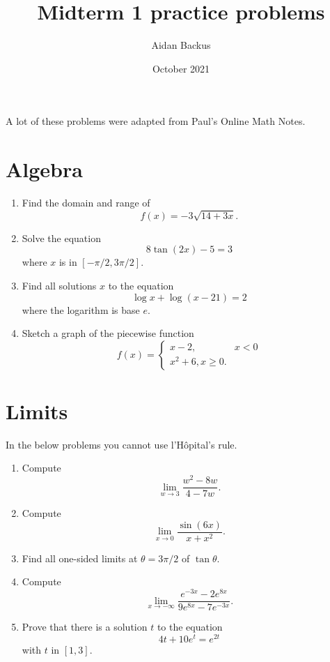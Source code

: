 \documentclass[reqno,12pt,letterpaper]{amsart}
\title{Midterm 1 practice problems}
\author{Aidan Backus}
\date{October 2021}
\theoremstyle{definition}
\numberwithin{equation}{section}
\begin{document}




A lot of these problems were adapted from Paul's Online Math Notes.

\section{Algebra}
\begin{enumerate}
\item Find the domain and range of
$$f(x) = -3\sqrt{14+3x}.$$
\item Solve the equation
$$8 \tan(2x) - 5 = 3$$
where $x$ is in $[-\pi/2, 3\pi/2]$.
\item Find all solutions $x$ to the equation
$$\log x + \log(x - 21) = 2$$
where the logarithm is base $e$.
\item Sketch a graph of the piecewise function
$$f(x) = \begin{cases} x - 2, &x < 0 \\
x^2 + 6, x \geq 0.
\end{cases}$$
\end{enumerate}

\section{Limits}
In the below problems you cannot use l'H\^opital's rule.
\begin{enumerate}
\item Compute
$$\lim_{w \to 3} \frac{w^2 - 8w}{4 - 7w}.$$
\item Compute
$$\lim_{x \to 0} \frac{\sin(6x)}{x + x^2}.$$
\item Find all one-sided limits at $\theta = 3\pi/2$ of $\tan \theta$.
\item Compute
$$\lim_{x \to -\infty} \frac{e^{-3x} - 2e^{8x}}{9e^{8x} - 7e^{-3x}}.$$
\item Prove that there is a solution $t$ to the equation
$$4t + 10e^t = e^{2t}$$
with $t$ in $[1, 3]$.
\end{enumerate}
\end{document}
